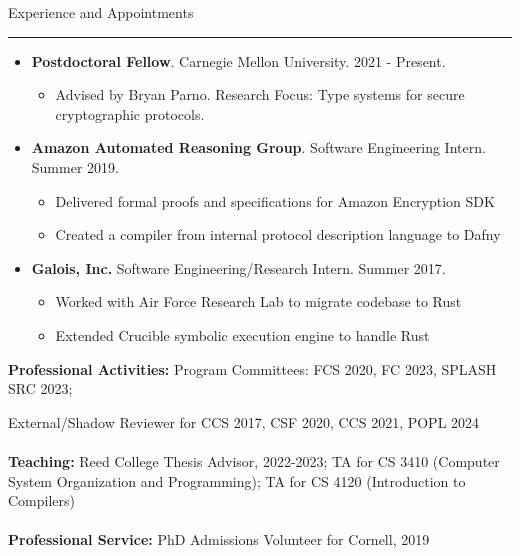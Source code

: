 \documentclass{article}
\newcommand{\rsection}[1]{\vspace{1em} {\huge #1} \vspace{0.5em} \hrule \vspace{1em}}
\begin{document}
\rsection{Experience and Appointments}
\begin{itemize}
    \item {\bf Postdoctoral Fellow}. Carnegie Mellon University. 2021 - Present.
        \begin{itemize}
            \item Advised by Bryan Parno. Research Focus: Type systems for secure cryptographic protocols. 
        \end{itemize}

    \item {\bf Amazon Automated Reasoning Group}. Software Engineering Intern.
        Summer 2019.
        \begin{itemize}
            \item Delivered formal proofs and specifications for Amazon Encryption SDK
            \item Created a compiler from internal protocol description language to Dafny
        \end{itemize}

    \item {\bf Galois, Inc.} Software Engineering/Research Intern. Summer 2017.
        \begin{itemize}
            \item Worked with Air Force Research Lab to migrate codebase to Rust
            \item Extended Crucible symbolic execution engine to handle Rust
        \end{itemize}
\end{itemize}
    {\bf Professional Activities:} Program Committees: FCS 2020, FC 2023, SPLASH
    SRC 2023; 

    External/Shadow Reviewer for CCS 2017, CSF 2020, CCS 2021, POPL 2024
    \\
    \\
    {\bf Teaching:} Reed College Thesis Advisor, 2022-2023; TA for CS 3410
    (Computer System Organization and Programming); TA for CS 4120 (Introduction
    to Compilers)
    \\
    \\
    {\bf Professional Service:} PhD Admissions Volunteer for Cornell, 2019
\end{document}
